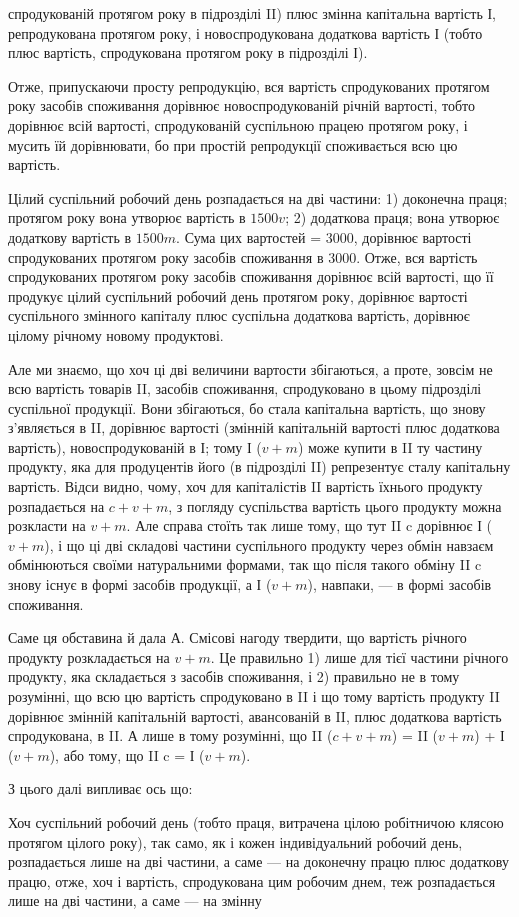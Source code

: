 \parcont{}  %
спродукованій протягом року в підрозділі II) плюс змінна капітальна
вартість І, репродукована протягом року, і новоспродукована додаткова
вартість І (тобто плюс вартість, спродукована протягом року в підрозділі
І).

Отже, припускаючи просту репродукцію, вся вартість спродукованих
протягом року засобів споживання дорівнює новоспродукованій річній
вартості, тобто дорівнює всій вартості, спродукованій суспільною працею
протягом року, і мусить їй дорівнювати, бо при простій репродукції
споживається всю цю вартість.

Цілий суспільний робочий день розпадається на дві частини: 1) доконечна
праця; протягом року вона утворює вартість в $1500 v$; 2) додаткова
праця; вона утворює додаткову вартість в $1500 m$. Сума цих
вартостей = 3000, дорівнює вартості спродукованих протягом року засобів
споживання в 3000. Отже, вся вартість спродукованих протягом
року засобів споживання дорівнює всій вартості, що її продукує цілий
суспільний робочий день протягом року, дорівнює вартості суспільного змінного
капіталу плюс суспільна додаткова вартість, дорівнює цілому річному
новому продуктові.

Але ми знаємо, що хоч ці дві величини вартости збігаються, а проте,
зовсім не всю вартість товарів II, засобів споживання, спродуковано
в цьому підрозділі суспільної продукції. Вони збігаються, бо стала
капітальна вартість, що знову з’являється в II, дорівнює вартості (змінній
капітальній вартості плюс додаткова вартість), новоспродукованій
в І; тому І ($v + m$) може купити в II ту частину продукту, яка для продуцентів
його (в підрозділі II) репрезентує сталу капітальну вартість. Відси
видно, чому, хоч для капіталістів II вартість їхнього продукту розпадається
на $c + v + m$, з погляду суспільства вартість цього продукту
можна розкласти на $v + m$. Але справа стоїть так лише тому, що тут
II c дорівнює І ($v + m$), і що ці дві складові частини суспільного продукту
через обмін навзаєм обмінюються своїми натуральними формами,
так що після такого обміну II c знову існує в формі засобів продукції,
а І ($v + m$), навпаки, — в формі засобів споживання.

Саме ця обставина й дала А. Смісові нагоду твердити, що вартість
річного продукту розкладається на $v + m$. Це правильно 1) лише для
тієї частини річного продукту, яка складається з засобів споживання, і
2) правильно не в тому розумінні, що всю цю вартість спродуковано в II і
що тому вартість продукту II дорівнює змінній капітальній вартості, авансованій
в II, плюс додаткова вартість спродукована, в II. А лише в тому
розумінні, що II ($c + v + m$) = II ($v + m$) + І ($v + m$), або тому, що
II c = І ($v + m$).

З цього далі випливає ось що:

Хоч суспільний робочий день (тобто праця, витрачена цілою робітничою
клясою протягом цілого року), так само, як і кожен індивідуальний
робочий день, розпадається лише на дві частини, а саме — на доконечну
працю плюс додаткову працю, отже, хоч і вартість, спродукована цим
робочим днем, теж розпадається лише на дві частини, а саме — на змінну
\parbreak{}  %
